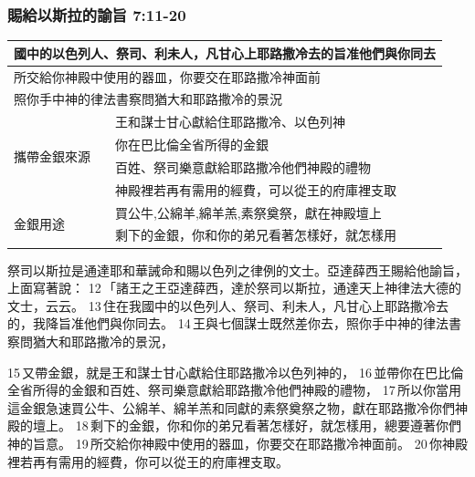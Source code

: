\subsubsection{賜給以斯拉的諭旨 7:11-20}
\begin{table}[H]
\centering 
\begin{tabular}{|p{3cm}|p{8cm}|}\hline\hline
\multicolumn{2}{|l|}{國中的以色列人、祭司、利未人，凡甘心上耶路撒冷去的旨准他們與你同去}\\\hline
\multicolumn{2}{|l|}{所交給你神殿中使用的器皿，你要交在耶路撒冷神面前}\\\hline
\multicolumn{2}{|l|}{照你手中神的律法書察問猶大和耶路撒冷的景況} \\\hline
\multirow{4}{6em}{攜帶金銀來源} &王和謀士甘心獻給住耶路撒冷、以色列神\\
                          &你在巴比倫全省所得的金銀\\
                          &百姓、祭司樂意獻給耶路撒冷他們神殿的禮物\\
                          &神殿裡若再有需用的經費，可以從王的府庫裡支取\\\hline
\multirow{2}{8em}{金銀用途} &買公牛,公綿羊,綿羊羔,素祭奠祭，獻在神殿壇上\\ 
&剩下的金銀，你和你的弟兄看著怎樣好，就怎樣用\\\hline
\end{tabular}
\end{table}
祭司以斯拉是通達耶和華誡命和賜以色列之律例的文士。亞達薛西王賜給他諭旨，上面寫著說： 12 「諸王之王亞達薛西，達於祭司以斯拉，通達天上神律法大德的文士，云云。 13 住在我國中的以色列人、祭司、利未人，凡甘心上耶路撒冷去的，我降旨准他們與你同去。
 14 王與七個謀士既然差你去，照你手中神的律法書察問猶大和耶路撒冷的景況， 

15 又帶金銀，就是王和謀士甘心獻給住耶路撒冷以色列神的， 16 並帶你在巴比倫全省所得的金銀和百姓、祭司樂意獻給耶路撒冷他們神殿的禮物， 17 所以你當用這金銀急速買公牛、公綿羊、綿羊羔和同獻的素祭奠祭之物，獻在耶路撒冷你們神殿的壇上。 18 剩下的金銀，你和你的弟兄看著怎樣好，就怎樣用，總要遵著你們神的旨意。 19 所交給你神殿中使用的器皿，你要交在耶路撒冷神面前。 20 你神殿裡若再有需用的經費，你可以從王的府庫裡支取。

